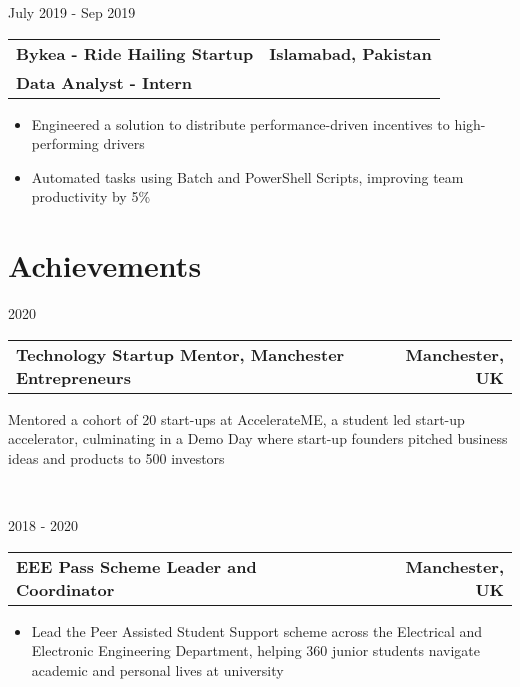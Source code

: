 \documentclass[letterpaper,11pt]{article}
\makeatletter
\newcommand{\resumeItem}[1]{
  \item\small{
    {#1 \vspace{-2pt}}
  }
}
\newcommand{\resumeSubheading}[4]{
  \vspace{-9pt}%
    \begin{tabular*}{0.97\textwidth}[t]{l@{\extracolsep{\fill}}r}
      \textbf{\small{#1}} & \textbf{\small{#2}} \\
      {\small#3} & {\small #4} \\
    \end{tabular*}\vspace{-7pt}
}
\newcommand{\resumeAchievements}[2]{
  \vspace{-9pt}%
    \begin{tabular*}{0.97\textwidth}[t]{l@{\extracolsep{\fill}}r}
      \textbf{\small{#1}} & \textbf{\small{#2}} \\
    \end{tabular*}\vspace{-7pt}
}
\newcommand{\resumeItemListStart}{\begin{itemize}}
\newcommand{\resumeItemListEnd}{\end{itemize}\vspace{-5pt}}
\makeatother
\begin{document}
\begin{minipage}[t]{0.1\textwidth}
\raggedright %
\small{July 2019 - Sep 2019}
\end{minipage}%
\begin{minipage}[t]{0.9\textwidth}
\begin{adjustwidth}{0.5cm}{0cm} %

\resumeSubheading
      {\small{Bykea - Ride Hailing Startup}}{\small{Islamabad, Pakistan}}
      {\textbf{\small{Data Analyst - Intern}}}{}

    \resumeItemListStart
        \resumeItem{Engineered a solution to distribute performance-driven incentives to high-performing drivers}
        \resumeItem{Automated tasks using Batch and PowerShell Scripts, improving team productivity by 5\%}
    \resumeItemListEnd
      
\end{adjustwidth}
\end{minipage}



\section{Achievements}
\begin{minipage}[t]{0.1\textwidth}
\raggedright %
\small{2020}
\end{minipage}%
\begin{minipage}[t]{0.9\textwidth}
\begin{adjustwidth}{0.5cm}{0cm} %

\resumeAchievements
      {\small{Technology Startup Mentor, Manchester Entrepreneurs}}{\small{Manchester, UK}}
    \vspace{-7pt}
    \resumeItemListStart
        \small{\resumeItem{Mentored a cohort of 20 start-ups at AccelerateME, a student led start-up accelerator, culminating in a Demo Day where start-up founders pitched business ideas and products to 500 investors}}\\
    \resumeItemListEnd
\end{adjustwidth}
\end{minipage}

\begin{minipage}[t]{0.1\textwidth}
\raggedright %
\small{2018 - 2020}
\end{minipage}%
\begin{minipage}[t]{0.9\textwidth}
\begin{adjustwidth}{0.5cm}{0cm} %

\resumeAchievements
      {EEE Pass Scheme Leader and Coordinator}{Manchester, UK}
    \vspace{-7pt}
    \resumeItemListStart
        \resumeItem{Lead the Peer Assisted Student Support scheme across the Electrical and Electronic Engineering Department, helping 360 junior students navigate academic and personal lives at university}
    \resumeItemListEnd  
\end{adjustwidth}
\end{minipage}
\end{document}
